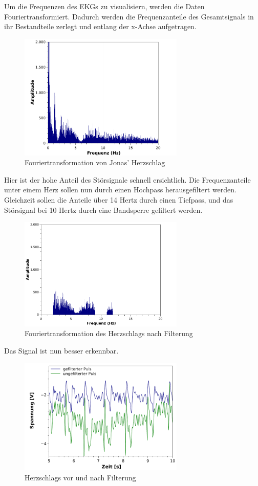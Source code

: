 Um die Frequenzen des EKGs zu visualisiern, werden die Daten Fouriertransformiert.
Dadurch werden die Frequenzanteile des Gesamtsignals in ihr Bestandteile zerlegt
und entlang der x-Achse aufgetragen.
\begin{figure}[H]
	\centering
	\includegraphics[width=0.7\textwidth]{Mess/Ekg/jonas_nofft.pdf}
	\caption{Fouriertransformation von Jonas' Herzschlag}
	\label{jonfftnofilter}
\end{figure}
Hier ist der hohe Anteil des Störsignale schnell ersichtlich.
Die Frequenzanteile unter einem Herz sollen nun durch einen Hochpass herausgefiltert werden.
Gleichzeit sollen die Anteile über 14 Hertz durch einen Tiefpass, und das Störsignal bei
10 Hertz durch eine Bandsperre gefiltert werden.
\begin{figure}[H]
	\centering
	\includegraphics[width=0.7\textwidth]{Mess/Ekg/jonas_fft.pdf}
	\caption{Fouriertransformation des Herzschlags nach Filterung}
	\label{jonfft}
\end{figure}
Das Signal ist nun besser erkennbar.
\begin{figure}[H]
	\centering
	\includegraphics[width=0.7\textwidth]{Mess/Ekg/jonas_filter.pdf}
	\caption{Herzschlags vor und nach Filterung}
	\label{jonfilter}
\end{figure}
